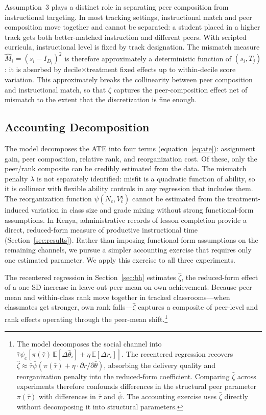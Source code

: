 \documentclass[11pt]{article}
\newcommand{\E}{\mathbb{E}}
\begin{document}
Assumption~3 plays a distinct role in separating peer composition from instructional targeting. In most tracking settings, instructional match and peer composition move together and cannot be separated: a student placed in a higher track gets both better-matched instruction and different peers. With scripted curricula, instructional level is fixed by track designation. The mismatch measure $\hat{M}_i = (s_i - I_{D_i})^2$ is therefore approximately a deterministic function of $(s_i, T_j)$: it is absorbed by decile$\times$treatment fixed effects up to within-decile score variation. This approximately breaks the collinearity between peer composition and instructional match, so that $\zeta$ captures the peer-composition effect net of mismatch to the extent that the discretization is fine enough.


\subsection{Accounting Decomposition}
\label{sec:accounting}

The model decomposes the ATE into four terms (equation~\ref{eq:ate}): assignment gain, peer composition, relative rank, and reorganization cost. Of these, only the peer/rank composite can be credibly estimated from the data. The mismatch penalty $\lambda$ is not separately identified: misfit is a quadratic function of ability, so it is collinear with flexible ability controls in any regression that includes them. The reorganization function $\psi(N_c, V^g_c)$ cannot be estimated from the treatment-induced variation in class size and grade mixing without strong functional-form assumptions. In Kenya, administrative records of lesson completion provide a direct, reduced-form measure of productive instructional time (Section~\ref{sec:results}). Rather than imposing functional-form assumptions on the remaining channels, we pursue a simpler accounting exercise that requires only one estimated parameter. We apply this exercise to all three experiments.

The recentered regression in Section~\ref{sec:bh} estimates $\hat{\zeta}$, the reduced-form effect of a one-SD increase in leave-out peer mean on own achievement. Because peer mean and within-class rank move together in tracked classrooms---when classmates get stronger, own rank falls---$\hat{\zeta}$ captures a composite of peer-level and rank effects operating through the peer-mean shift.\footnote{The model decomposes the social channel into $\bar{\tau}\psi_c[\pi(\bar{\tau})\,\E[\Delta\bar{\theta}_i] + \eta\,\E[\Delta r_i]]$. The recentered regression recovers $\hat{\zeta} \approx \bar{\tau}\bar{\psi}(\pi(\bar{\tau}) + \eta \cdot \partial r / \partial \bar{\theta})$, absorbing the delivery quality and reorganization penalty into the reduced-form coefficient. Comparing $\hat{\zeta}$ across experiments therefore confounds differences in the structural peer parameter $\pi(\bar{\tau})$ with differences in $\bar{\tau}$ and $\bar{\psi}$. The accounting exercise uses $\hat{\zeta}$ directly without decomposing it into structural parameters.}
\end{document}
